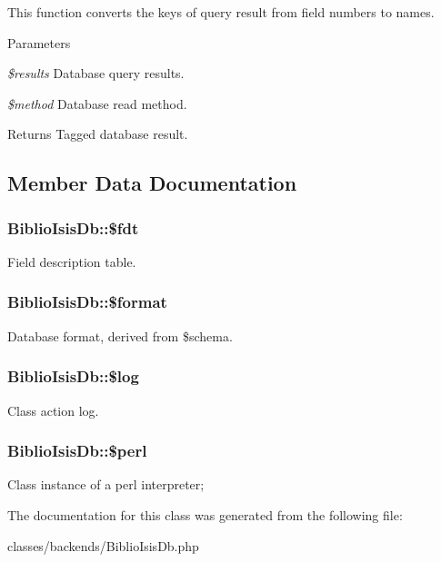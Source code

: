 This function converts the keys of query result from field numbers to names.


\begin{DoxyParams}{Parameters}
\item[{\em \$results}]Database query results.\item[{\em \$method}]Database read method.\end{DoxyParams}
\begin{DoxyReturn}{Returns}
Tagged database result. 
\end{DoxyReturn}


\subsection{Member Data Documentation}
\hypertarget{classBiblioIsisDb_a978a9243ea53b1f2426115d7b4191b07}{
\subsubsection[{\$fdt}]{\setlength{\rightskip}{0pt plus 5cm}BiblioIsisDb::\$fdt}}
\label{classBiblioIsisDb_a978a9243ea53b1f2426115d7b4191b07}
Field description table. \hypertarget{classBiblioIsisDb_ab9fb3b6f10d2734a198ca7802ee38c2d}{
\subsubsection[{\$format}]{\setlength{\rightskip}{0pt plus 5cm}BiblioIsisDb::\$format}}
\label{classBiblioIsisDb_ab9fb3b6f10d2734a198ca7802ee38c2d}
Database format, derived from \$schema. \hypertarget{classBiblioIsisDb_a67337d78af0fc21d0ff10471aa638c62}{
\subsubsection[{\$log}]{\setlength{\rightskip}{0pt plus 5cm}BiblioIsisDb::\$log}}
\label{classBiblioIsisDb_a67337d78af0fc21d0ff10471aa638c62}
Class action log. \hypertarget{classBiblioIsisDb_a7eccfa964dcd1469a263340447c38143}{
\subsubsection[{\$perl}]{\setlength{\rightskip}{0pt plus 5cm}BiblioIsisDb::\$perl}}
\label{classBiblioIsisDb_a7eccfa964dcd1469a263340447c38143}
Class instance of a perl interpreter; 

The documentation for this class was generated from the following file:\begin{DoxyCompactItemize}
\item 
classes/backends/BiblioIsisDb.php\end{DoxyCompactItemize}
